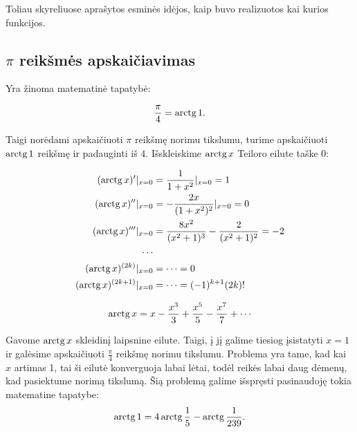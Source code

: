 Toliau skyreliuose aprašytos esminės idėjos, kaip buvo realizuotos kai
kurios funkcijos.



\subsection{$\pi$ reikšmės apskaičiavimas}

Yra žinoma matematinė tapatybė:

\begin{equation}
  \frac{\pi}{4} = \mathop{\text{arctg}} 1.
  \label{pi_1}
\end{equation}

Taigi norėdami apskaičiuoti $\pi$ reikšmę norimu tikslumu, turime 
apskaičiuoti $\mathop{\text{arctg}} 1$ reikšmę ir padauginti iš $4$. Išskleiskime
$\mathop{\text{arctg}} x$ Teiloro eilute taške $0$:

\begin{align*}
  (\arctg x)'|_{x=0} &= \frac{1}{1 + x^2}|_{x=0} = 1 \\
  (\arctg x)''|_{x=0} &= -\frac{2 x}{(1 + x^2)^2}|_{x=0} = 0 \\
  (\arctg x)'''|_{x=0} &=%
    \frac{8 x^2}{(x^2 + 1)^3} - \frac{2}{(x^2 + 1)^2} = -2 \\
  \cdots\\
  (\arctg x)^{(2k)}|_{x=0} &= \cdots = 0 \\
  (\arctg x)^{(2k+1)}|_{x=0} &= \cdots = (-1)^{k+1}(2k)! 
\end{align*}

\begin{equation}
  \arctg x = x - \frac{x^3}{3} + \frac{x^5}{5} - \frac{x^7}{7}%
    + \cdots
  \label{pi_2}
\end{equation}

Gavome $\mathop{\text{arctg}} x$ skleidinį laipsnine eilute. Taigi, į jį galime 
tiesiog įsistatyti $x = 1$ ir galėsime apskaičiuoti $\frac{\pi}{4}$ reikšmę
norimu tikslumu. Problema yra tame, kad kai $x$ artimas 1, tai ši
eilutė konverguoja labai lėtai, todėl reikės labai daug dėmenų, kad
pasiektume norimą tikslumą. Šią problemą galime išspręsti pasinaudoję
tokia matematine tapatybe: %
\begin{equation}
  \mathop{\text{arctg}} 1 = 4 \mathop{\text{arctg}} \frac{1}{5} - \mathop{\text{arctg}} \frac{1}{239}.
  \label{pi_3}
\end{equation}

